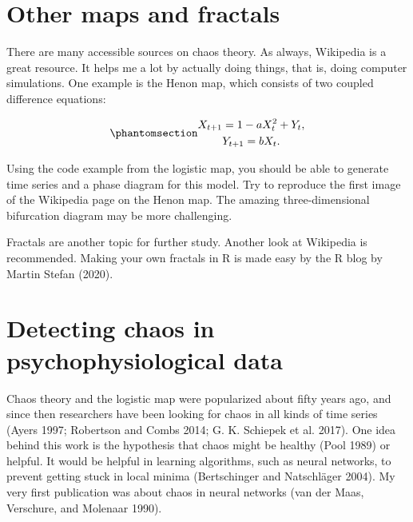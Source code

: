 \documentclass[
  a4paper,
  DIV=11,
  numbers=noendperiod,
  oneside]{scrreprt}
\begin{document}
\section{Other maps and fractals}\label{sec-Other-maps-and-fractals}

There are many accessible sources on chaos theory. As always, Wikipedia
is a great resource. It helps me a lot by actually doing things, that
is, doing computer simulations. One example is the Henon map, which
consists of two coupled difference equations:

\begin{equation}\phantomsection\label{eq-ch2-4}{
\begin{gathered}
X_{t + 1} = 1 - aX_{t}^{2} + Y_{t}, \\
Y_{t + 1} = bX_{t}. 
\end{gathered}
}\end{equation}

Using the code example from the logistic map, you should be able to
generate time series and a phase diagram for this model. Try to
reproduce the first image of the Wikipedia page on the Henon map. The
amazing three-dimensional bifurcation diagram may be more challenging.

Fractals are another topic for further study. Another look at Wikipedia
is recommended. Making your own fractals in R is made easy by the R blog
by Martin Stefan (2020).

\section{Detecting chaos in psychophysiological
data}\label{sec-Detecting-chaos-in-psychophysiological-data}

Chaos theory and the logistic map were popularized about fifty years
ago, and since then researchers have been looking for chaos in all kinds
of time series (Ayers 1997; Robertson and Combs 2014; G. K. Schiepek et
al. 2017). One idea behind this work is the hypothesis that chaos might
be healthy (Pool 1989) or helpful. It would be helpful in learning
algorithms, such as neural networks, to prevent getting stuck in local
minima (Bertschinger and Natschläger 2004). My very first publication
was about chaos in neural networks (van der Maas, Verschure, and
Molenaar 1990).
\end{document}
